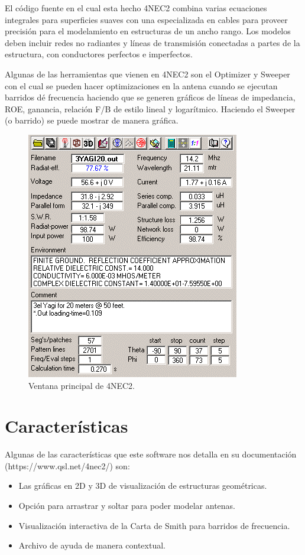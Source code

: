 \documentclass[12pt]{article}
\begin{document}
El código fuente en el cual esta hecho 4NEC2 combina varias ecuaciones
integrales para superficies suaves con una especializada en cables para proveer
precisión para el modelamiento en estructuras de un ancho rango. Los modelos
deben incluir redes no radiantes y líneas de transmisión conectadas a partes de
la estructura, con conductores perfectos e imperfectos.

Algunas de las herramientas que vienen en 4NEC2 son el Optimizer y Sweeper con
el cual se pueden hacer optimizaciones en la antena cuando se ejecutan barridos
dé frecuencia haciendo que se generen gr\'aficos de líneas de impedancia, ROE,
ganancia, relación F/B de estilo lineal y logarítmico. Haciendo el Sweeper (o
barrido) se puede mostrar de manera gr\'afica.

\begin{figure}[H]
\centering
\includegraphics[width=.4\linewidth]{images/image002.png}
\caption{Ventana principal de 4NEC2.}
\end{figure}

\section{Características}

Algunas de las características que este software nos detalla en su
documentación (https://www\-.qsl.net/4nec2/) son:

\begin{itemize}
\item Las gr\'aficas en 2D y 3D de visualización de estructuras geométricas.
\item Opción para arrastrar y soltar para poder modelar antenas.
\item Visualización interactiva de la Carta de Smith para barridos de
frecuencia.
\item Archivo de ayuda de manera contextual.
\end{itemize}
\end{document}
